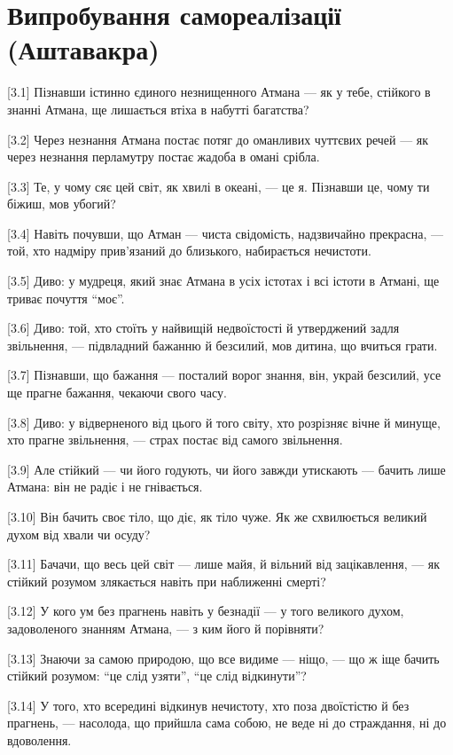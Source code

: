 \chapter[(Аштавакра)]{Випробування самореалізації (Аштавакра)}

[3.1] Пізнавши істинно єдиного незнищенного Атмана --- як у тебе, стійкого в знанні Атмана, ще лишається втіха в набутті багатства?

[3.2] Через незнання Атмана постає потяг до оманливих чуттєвих речей --- як через незнання перламутру постає жадоба в омані срібла.

[3.3] Те, у чому сяє цей світ, як хвилі в океані, --- це я. Пізнавши це, чому ти біжиш, мов убогий?

[3.4] Навіть почувши, що Атман --- чиста свідомість, надзвичайно прекрасна, --- той, хто надміру прив'язаний до близького, набирається нечистоти.

[3.5] Диво: у мудреця, який знає Атмана в усіх істотах і всі істоти в Атмані, ще триває почуття ``моє''.

[3.6] Диво: той, хто стоїть у найвищій недвоїстості й утверджений задля звільнення, --- підвладний бажанню й безсилий, мов дитина, що вчиться грати.

[3.7] Пізнавши, що бажання --- посталий ворог знання, він, украй безсилий, усе ще прагне бажання, чекаючи свого часу.

[3.8] Диво: у відверненого від цього й того світу, хто розрізняє вічне й минуще, хто прагне звільнення, --- страх постає від самого звільнення.

[3.9] Але стійкий --- чи його годують, чи його завжди утискають --- бачить лише Атмана: він не радіє і не гнівається.

[3.10] Він бачить своє тіло, що діє, як тіло чуже. Як же схвилюється великий духом від хвали чи осуду?

[3.11] Бачачи, що весь цей світ --- лише майя, й вільний від зацікавлення, --- як стійкий розумом злякається навіть при наближенні смерті?

[3.12] У кого ум без прагнень навіть у безнадії --- у того великого духом, задоволеного знанням Атмана, --- з ким його й порівняти?

[3.13] Знаючи за самою природою, що все видиме --- ніщо, --- що ж іще бачить стійкий розумом: ``це слід узяти'', ``це слід відкинути''?

[3.14] У того, хто всередині відкинув нечистоту, хто поза двоїстістю й без прагнень, --- насолода, що прийшла сама собою, не веде ні до страждання, ні до вдоволення.
